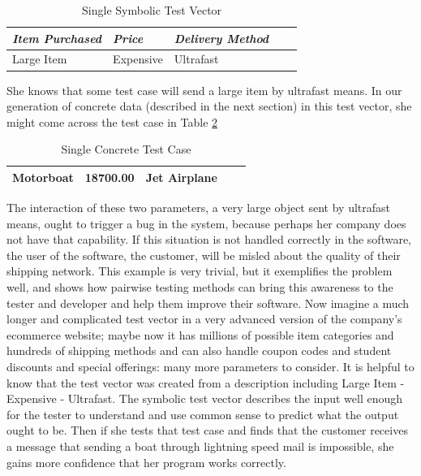 \begin{table}[h!]
\centering
\begin{tabular}{@{} *5l @{}}    \toprule
\emph{Item Purchased} & \emph{Price} & \emph{Delivery Method}  \\\midrule
Large Item & Expensive & Ultrafast \\\bottomrule
 \hline
\end{tabular}
\caption{Single Symbolic Test Vector}
\label{table:testv}
\end{table}

She knows that some test case will send a large item by ultrafast means. In our generation of concrete data (described in the next section) in this test vector, she might come across the test case in Table \ref{table:conctc}

\begin{table}[h!]
\centering
\begin{tabular}{@{} *5l @{}}    \toprule
Motorboat & 18700.00 & Jet Airplane \\\bottomrule
 \hline
\end{tabular}
\caption{Single Concrete Test Case}
\label{table:conctc}
\end{table}

The interaction of these two parameters, a very large object sent by ultrafast means, ought to trigger a bug in the system, because perhaps her company does not have that capability. If this situation is not handled correctly in the software, the user of the software, the customer, will be misled about the quality of their shipping network. This example is very trivial, but it exemplifies the problem well, and shows how pairwise testing methods can bring this awareness to the tester and developer and help them improve their software. Now imagine a much longer and complicated test vector in a very advanced version of the company’s ecommerce website; maybe now it has millions of possible item categories and hundreds of shipping methods and can also handle coupon codes and student discounts and special offerings: many more parameters to consider. It is helpful to know that the test vector was created from a description including Large Item - Expensive - Ultrafast. The symbolic test vector describes the input well enough for the tester to understand and use common sense to predict what the output ought to be. Then if she tests that test case and finds that the customer receives a message that sending a boat through lightning speed mail is impossible, she gains more confidence that her program works correctly.

